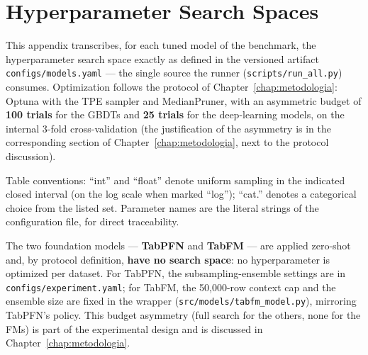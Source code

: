 \chapter{Hyperparameter Search Spaces}
\label{app:espacos-busca}

This appendix transcribes, for each tuned model of the benchmark, the
hyperparameter search space exactly as defined in the versioned
artifact \texttt{configs/\allowbreak models.\allowbreak yaml} --- the
single source the runner
(\texttt{scripts/\allowbreak run\_\allowbreak all.\allowbreak py})
consumes. Optimization follows the protocol of
Chapter~\ref{chap:metodologia}: Optuna with the TPE sampler and
MedianPruner, with an asymmetric budget of \textbf{100 trials} for the
GBDTs and \textbf{25 trials} for the deep-learning models, on the
internal 3-fold cross-validation (the justification of the asymmetry
is in the corresponding section of Chapter~\ref{chap:metodologia},
next to the protocol discussion).

Table conventions: ``int'' and ``float'' denote uniform sampling in
the indicated closed interval (on the log scale when marked ``log'');
``cat.'' denotes a categorical choice from the listed set. Parameter
names are the literal strings of the configuration file, for direct
traceability.

The two foundation models --- \textbf{TabPFN} and \textbf{TabFM} ---
are applied zero-shot and, by protocol definition, \textbf{have no
search space}: no hyperparameter is optimized per dataset. For
TabPFN, the subsampling-ensemble settings are in
\texttt{configs/\allowbreak experiment.\allowbreak yaml}; for TabFM,
the 50{,}000-row context cap and the ensemble size are fixed in the
wrapper
(\texttt{src/\allowbreak models/\allowbreak tabfm\_\allowbreak model.\allowbreak py}),
mirroring TabPFN's policy. This budget asymmetry (full search for the
others, none for the FMs) is part of the experimental design and is
discussed in Chapter~\ref{chap:metodologia}.

